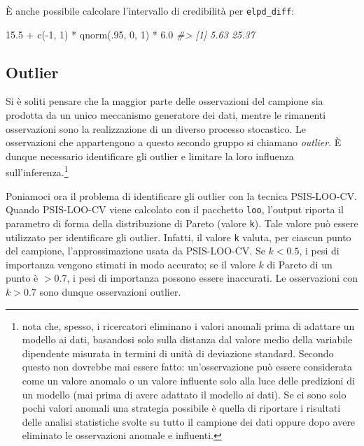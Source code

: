 \documentclass[
  10pt,
  italian,
  a4paper,
  extrafontsizes,onecolumn,openright
  ]{memoir}
\newenvironment{Shaded}{\begin{snugshade}}{\end{snugshade}}
\newcommand{\CommentTok}[1]{\textcolor[rgb]{0.56,0.35,0.01}{\textit{#1}}}
\newcommand{\DecValTok}[1]{\textcolor[rgb]{0.00,0.00,0.81}{#1}}
\newcommand{\FloatTok}[1]{\textcolor[rgb]{0.00,0.00,0.81}{#1}}
\newcommand{\FunctionTok}[1]{\textcolor[rgb]{0.00,0.00,0.00}{#1}}
\newcommand{\NormalTok}[1]{#1}
\newcommand{\SpecialCharTok}[1]{\textcolor[rgb]{0.00,0.00,0.00}{#1}}
\theoremstyle{definition}
\theoremstyle{definition}
\theoremstyle{definition}
\theoremstyle{definition}
\theoremstyle{remark}
\begin{document}
È anche possibile calcolare l'intervallo di credibilità per \texttt{elpd\_diff}:

\begin{Shaded}
\begin{Highlighting}[]
\FloatTok{15.5} \SpecialCharTok{+} \FunctionTok{c}\NormalTok{(}\SpecialCharTok{{-}}\DecValTok{1}\NormalTok{, }\DecValTok{1}\NormalTok{) }\SpecialCharTok{*} \FunctionTok{qnorm}\NormalTok{(.}\DecValTok{95}\NormalTok{, }\DecValTok{0}\NormalTok{, }\DecValTok{1}\NormalTok{) }\SpecialCharTok{*} \FloatTok{6.0}
\CommentTok{\#\textgreater{} [1]  5.63 25.37}
\end{Highlighting}
\end{Shaded}

\hypertarget{outlier}{%
\subsection{Outlier}\label{outlier}}

Si è soliti pensare che la maggior parte delle osservazioni del campione sia prodotta da un unico meccanismo generatore dei dati, mentre le rimanenti osservazioni sono la realizzazione di un diverso processo stocastico. Le osservazioni che appartengono a questo secondo gruppo si chiamano \emph{outlier}. È dunque necessario identificare gli outlier e limitare la loro influenza sull'inferenza.\footnote{\textcite{McElreath_rethinking} nota che, spesso, i ricercatori eliminano i valori anomali prima di adattare un modello ai dati, basandosi solo sulla distanza dal valore medio della variabile dipendente misurata in termini di unità di deviazione standard. Secondo \textcite{McElreath_rethinking} questo non dovrebbe mai essere fatto: un'osservazione può essere considerata come un valore anomalo o un valore influente solo alla luce delle predizioni di un modello (mai prima di avere adattato il modello ai dati). Se ci sono solo pochi valori anomali una strategia possibile è quella di riportare i risultati delle analisi statistiche svolte su tutto il campione dei dati oppure dopo avere eliminato le osservazioni anomale e influenti.}

Poniamoci ora il problema di identificare gli outlier con la tecnica PSIS-LOO-CV. Quando PSIS-LOO-CV viene calcolato con il pacchetto \texttt{loo}, l'output riporta il parametro di forma della distribuzione di Pareto (valore \texttt{k}). Tale valore può essere utilizzato per identificare gli outlier. Infatti, il valore \texttt{k} valuta, per ciascun punto del campione, l'approssimazione usata da PSIS-LOO-CV. Se \(k < 0.5\), i pesi di importanza vengono stimati in modo accurato; se il valore \(k\) di Pareto di un punto è \(> 0.7\), i pesi di importanza possono essere inaccurati. Le osservazioni con \(k > 0.7\) sono dunque osservazioni outlier.
\end{document}
